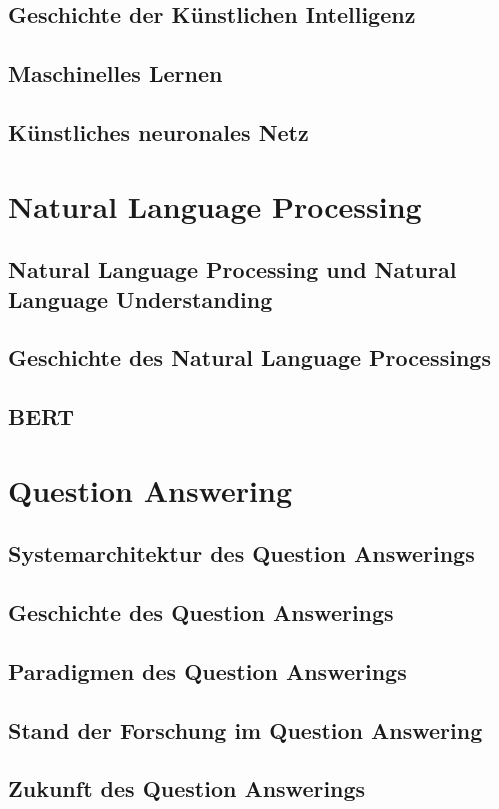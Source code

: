 \documentclass[
        ngerman,
        paper=a4,
        numbers=noendperiod,
]{scrreprt}
\begin{document}
\subsection{Geschichte der Künstlichen Intelligenz}
\subsection{Maschinelles Lernen}
\subsection{Künstliches neuronales Netz}

\section{Natural Language Processing}
\subsection{Natural Language Processing und Natural Language Understanding}
\subsection{Geschichte des Natural Language Processings}
\subsection{BERT}


\section{Question Answering}
\subsection{Systemarchitektur des Question Answerings}
\subsection{Geschichte des Question Answerings}
\subsection{Paradigmen des Question Answerings}
\subsection{Stand der Forschung im Question Answering}
\subsection{Zukunft des Question Answerings}
\end{document}
